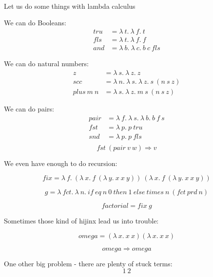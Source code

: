 \begin{frame}
  Let us do some things with lambda calculus
\end{frame}

\begin{frame}
  We can do Booleans:
  \begin{align*}
   tru &= \lambda~t.~\lambda~f.~t \\
   fls &= \lambda~t.~\lambda~f.~f \\
   and &= \lambda~b.~\lambda~c.~b~c~fls
  \end{align*}
\end{frame}

\begin{frame}
  We can do natural numbers:
  \begin{align*}
  z &= \lambda~s.~\lambda~z.~z \\
  scc &= \lambda~n.~\lambda~s.~\lambda~z.~s~\left(n~s~z\right) \\
  plus~m~n &= \lambda~s.~\lambda~z.~m~s~\left(n~s~z\right)
  \end{align*}
\end{frame}

\begin{frame}
  We can do pairs:
  \begin{align*}
    pair &= \lambda~f.~\lambda~s.~\lambda~b.~b~f~s \\
    fst &= \lambda~p.~p~tru \\
    snd &= \lambda~p.~p~fls \\
  \end{align*}
  \[fst~\left(pair~v~w\right) \Rightarrow v\]
\end{frame}

\begin{frame}
  We even have enough to do recursion:
  
  \[fix = \lambda~f.~\left(\lambda~x.~f~\left(\lambda~y.~x~x~y\right)\right)~\left(\lambda~x.~f~\left(\lambda~y.~x~x~y\right)\right)\]

  \[g = \lambda~fct.~\lambda~n.~if~eq~n~0~then~1~else~times~n~\left(fct~prd~n\right)\]

  \[factorial = fix~g\]
\end{frame}

\begin{frame}
  Sometimes those kind of hijinx lead us into trouble:
  
  \[omega = \left(\lambda~x.~x~x\right) \left(\lambda~x.~x~x\right)\]

  \[omega \Rightarrow omega\]
\end{frame}

\begin{frame}
  One other big problem - there are plenty of stuck terms:
  \[1~2\]
\end{frame}


